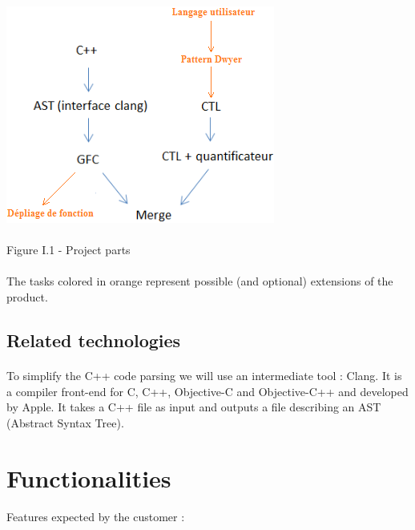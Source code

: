\documentclass{report}
\begin{document}
\begin{center}
\includegraphics[scale=0.7]{data/tasks}
~\\~\\Figure I.1 - Project parts
\end{center}

\paragraph{}
\hspace{4mm}\textnormal{The tasks colored in orange represent possible (and optional) extensions of the product.}

\subsection{Related technologies}

\paragraph{}
\hspace{4mm}\textnormal{To simplify the C++ code parsing we will use an intermediate tool : Clang. It is a compiler front-end for C, C++, Objective-C and Objective-C++ and developed by Apple. It takes a C++ file as input and outputs a file describing an AST (Abstract Syntax Tree).}

\section{Functionalities}

\paragraph{}
\hspace{4mm}\textnormal{Features expected by the customer :}
\end{document}
